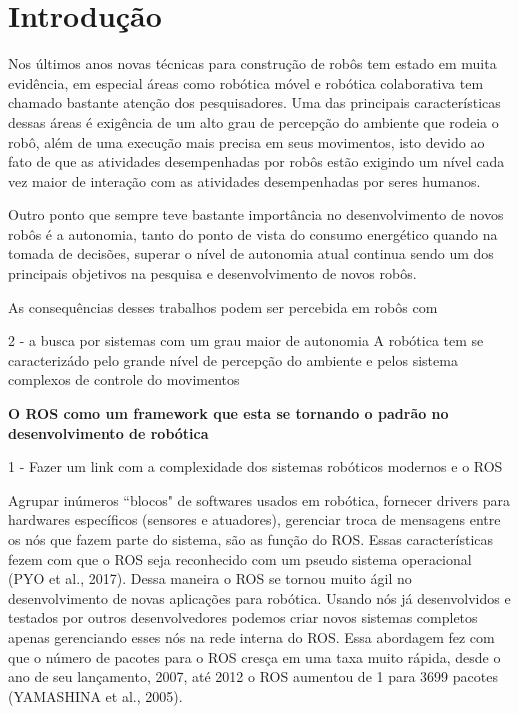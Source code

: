 \chapter{Introdução}


Nos últimos anos novas técnicas para construção de robôs tem estado em muita evidência, em 
especial áreas como robótica móvel e robótica colaborativa tem chamado bastante atenção dos 
pesquisadores. Uma das principais características dessas áreas é exigência de um alto grau de 
percepção do ambiente que rodeia o robô, além de uma execução mais precisa em seus movimentos, 
isto devido ao fato de que as atividades desempenhadas por robôs estão exigindo um nível cada 
vez maior de interação com as atividades desempenhadas por seres humanos.


Outro ponto que sempre teve bastante importância no desenvolvimento 
de novos robôs é a autonomia, tanto do ponto de vista do consumo energético quando na tomada 
de decisões, superar o nível de autonomia atual continua sendo um dos principais objetivos na 
pesquisa e desenvolvimento de novos robôs.

As consequências desses trabalhos podem ser percebida em robôs com 

2 - a busca por sistemas com um grau maior de autonomia
A robótica tem se caracterizádo pelo grande nível de percepção do ambiente e pelos sistema
complexos de controle do movimentos 


\textbf{O ROS como um framework que esta se tornando o padrão no desenvolvimento de robótica}

1 - Fazer um link com a complexidade dos sistemas robóticos modernos e o ROS

Agrupar inúmeros “blocos" de softwares usados em robótica, fornecer drivers para hardwares
específicos (sensores e atuadores), gerenciar troca de mensagens entre os nós que fazem 
parte do sistema, são as função do ROS. Essas características fezem com que o ROS seja 
reconhecido com um pseudo sistema operacional (PYO et al., 2017). Dessa maneira o ROS se 
tornou muito ágil no desenvolvimento de novas aplicações para robótica. Usando nós já 
desenvolvidos e testados por outros desenvolvedores podemos criar novos sistemas 
completos apenas gerenciando esses nós na rede interna do ROS. Essa abordagem fez com 
que o número de pacotes para o ROS cresça em uma taxa muito rápida, desde o ano de seu 
lançamento, 2007, até 2012 o ROS aumentou de 1 para 3699 pacotes (YAMASHINA et al., 2005).

